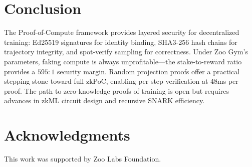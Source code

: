 \documentclass[11pt,letterpaper]{article}
\begin{document}
\section{Conclusion}

The Proof-of-Compute framework provides layered security for decentralized training: Ed25519 signatures for identity binding, SHA3-256 hash chains for trajectory integrity, and spot-verify sampling for correctness.  Under Zoo Gym's parameters, faking compute is always unprofitable---the stake-to-reward ratio provides a $595:1$ security margin.  Random projection proofs offer a practical stepping stone toward full zkPoC, enabling per-step verification at 48ms per proof.  The path to zero-knowledge proofs of training is open but requires advances in zkML circuit design and recursive SNARK efficiency.

\section*{Acknowledgments}

This work was supported by Zoo Labs Foundation.
\end{document}
